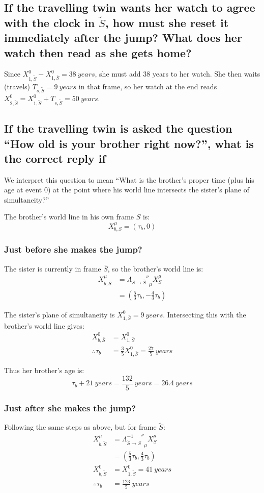 \documentclass[a4paper]{scrartcl}
\begin{document}
\subsection{If the travelling twin wants her watch to agree with the clock in \(\tilde{S}\), how must she reset it immediately after the jump? What does her watch then read as she gets home?}
Since \(X^0_{1, \tilde{S}} - X^0_{1, \bar{S}} = \SI{38}{years}\), she must add 38 years to her watch. She then waits (travels) \(T_{s, \tilde{S}} = \SI{9}{years}\) in that frame, so her watch at the end reads \(X^0_{2, \tilde{S}} = X^0_{1, \tilde{S}} + T_{s, \tilde{S}} = \SI{50}{years}\).

\subsection{If the travelling twin is asked the question ``How old is your brother right now?'', what is the correct reply if}
We interpret this question to mean ``What is the brother's proper time (plus his age at event 0) at the point where his world line intersects the sister's plane of simultaneity?''

The brother's world line in his own frame \(S\) is:
\[X^\mu_{b, S} = (\tau_b, 0)\]

\subsubsection{Just before she makes the jump?}
The sister is currently in frame \(\bar{S}\), so the brother's world line is:
\begin{align*}
    X^\mu_{b, \bar{S}} &= {{\Lambda_{S \to \bar{S}}}^\nu}_\mu X^\mu_S \\
    &= \left(\frac{5}{3} \tau_b, -\frac{4}{3} \tau_b\right)
\end{align*}

The sister's plane of simultaneity is \(X^0_{1, \bar{S}} = \SI{9}{years}\). Intersecting this with the brother's world line gives:
\begin{align*}
    X^0_{b, \bar{S}} &= X^0_{1, \bar{S}} \\
    \therefore \tau_b &= \frac{3}{5} X^0_{1, \bar{S}} = \frac{27}{5} \:\si{years}
\end{align*}

Thus her brother's age is:
\[\tau_b + \SI{21}{years} = \frac{132}{5} \:\si{years} = \SI{26.4}{years}\]

\subsubsection{Just after she makes the jump?}
Following the same steps as above, but for frame \(\tilde{S}\):
\begin{align*}
    X^\mu_{b, \tilde{S}} &= {{\Lambda_{\tilde{S} \to S}^{-1}}^\nu}_\mu X^\mu_S \\
    &= \left(\frac{5}{3} \tau_b, \frac{4}{3} \tau_b\right) \\
    X^0_{b, \tilde{S}} &= X^0_{1, \tilde{S}} = \SI{41}{years} \\
    \therefore \tau_b &= \frac{123}{5} \:\si{years}
\end{align*}
\end{document}
